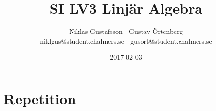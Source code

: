 \documentclass{article}
\title{SI LV3 Linjär Algebra}
\author{Niklas Gustafsson | Gustav Örtenberg  \\ \small{niklgus@student.chalmers.se} | \small{gusort@student.chalmers.se}}
\date{2017-02-03}
\begin{document}
\maketitle
\section*{Repetition}

\section{}


\section{}


\section{}


\section{}


\section{}


\section{}

\end{document}
